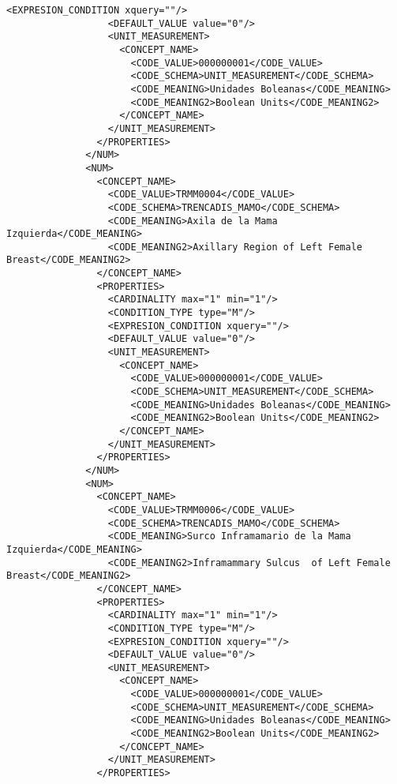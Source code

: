 \begin{lstlisting}[label=some-code,caption=Some Code]
                  <EXPRESION_CONDITION xquery=""/>
                  <DEFAULT_VALUE value="0"/>
                  <UNIT_MEASUREMENT>
                    <CONCEPT_NAME>
                      <CODE_VALUE>000000001</CODE_VALUE>
                      <CODE_SCHEMA>UNIT_MEASUREMENT</CODE_SCHEMA>
                      <CODE_MEANING>Unidades Boleanas</CODE_MEANING>
                      <CODE_MEANING2>Boolean Units</CODE_MEANING2>
                    </CONCEPT_NAME>
                  </UNIT_MEASUREMENT>
                </PROPERTIES>
              </NUM>
              <NUM>
                <CONCEPT_NAME>
                  <CODE_VALUE>TRMM0004</CODE_VALUE>
                  <CODE_SCHEMA>TRENCADIS_MAMO</CODE_SCHEMA>
                  <CODE_MEANING>Axila de la Mama Izquierda</CODE_MEANING>
                  <CODE_MEANING2>Axillary Region of Left Female Breast</CODE_MEANING2>
                </CONCEPT_NAME>
                <PROPERTIES>
                  <CARDINALITY max="1" min="1"/>
                  <CONDITION_TYPE type="M"/>
                  <EXPRESION_CONDITION xquery=""/>
                  <DEFAULT_VALUE value="0"/>
                  <UNIT_MEASUREMENT>
                    <CONCEPT_NAME>
                      <CODE_VALUE>000000001</CODE_VALUE>
                      <CODE_SCHEMA>UNIT_MEASUREMENT</CODE_SCHEMA>
                      <CODE_MEANING>Unidades Boleanas</CODE_MEANING>
                      <CODE_MEANING2>Boolean Units</CODE_MEANING2>
                    </CONCEPT_NAME>
                  </UNIT_MEASUREMENT>
                </PROPERTIES>
              </NUM>
              <NUM>
                <CONCEPT_NAME>
                  <CODE_VALUE>TRMM0006</CODE_VALUE>
                  <CODE_SCHEMA>TRENCADIS_MAMO</CODE_SCHEMA>
                  <CODE_MEANING>Surco Inframamario de la Mama Izquierda</CODE_MEANING>
                  <CODE_MEANING2>Inframammary Sulcus  of Left Female Breast</CODE_MEANING2>
                </CONCEPT_NAME>
                <PROPERTIES>
                  <CARDINALITY max="1" min="1"/>
                  <CONDITION_TYPE type="M"/>
                  <EXPRESION_CONDITION xquery=""/>
                  <DEFAULT_VALUE value="0"/>
                  <UNIT_MEASUREMENT>
                    <CONCEPT_NAME>
                      <CODE_VALUE>000000001</CODE_VALUE>
                      <CODE_SCHEMA>UNIT_MEASUREMENT</CODE_SCHEMA>
                      <CODE_MEANING>Unidades Boleanas</CODE_MEANING>
                      <CODE_MEANING2>Boolean Units</CODE_MEANING2>
                    </CONCEPT_NAME>
                  </UNIT_MEASUREMENT>
                </PROPERTIES>

\end{lstlisting}
